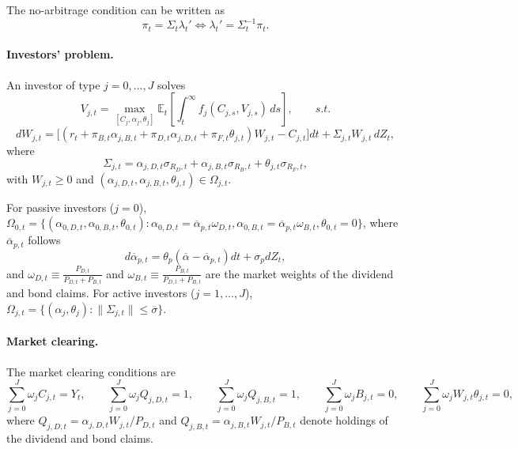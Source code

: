 \documentclass[11pt,english]{article}
\begin{document}
The no-arbitrage condition can be written as
\begin{equation}
    \pi_t = \Sigma_t \lambda_t' \iff \lambda_t'  = \Sigma_t^{-1} \pi_t.
\end{equation}

\paragraph{Investors' problem.} 

An investor of type $j = 0,\ldots,J$ solves
\begin{equation}\label{eq:inv-problem}
    V_{j,t} = \max_{[C_j,\alpha_j,\theta_j]} 
    \mathbb{E}_t \left[ \int_t^\infty f_j(C_{j,s},V_{j,s})\, ds \right], \qquad s.t.
\end{equation}
\begin{equation}
dW_{j,t} = \big[(r_t + \pi_{B,t} \alpha_{j,B,t}+ \pi_{D,t} \alpha_{j,D,t} + \pi_{F,t} \theta_{j,t}) W_{j,t} - C_{j,t}\big] dt 
    + \Sigma_{j,t} W_{j,t} \, dZ_t,
\end{equation}
where 
\begin{equation}
    \Sigma_{j,t} = \alpha_{j,D,t} \sigma_{R_D,t} +\alpha_{j,B,t} \sigma_{R_B,t} + \theta_{j,t} \sigma_{R_F,t},
\end{equation}
with $W_{j,t} \geq 0$ and $(\alpha_{j,D,t}, \alpha_{j,B,t}, \theta_{j,t}) \in \Omega_{j,t}$. 

For passive investors ($j=0$),  
$\Omega_{0,t} = \{(\alpha_{0,D,t}, \alpha_{0,B,t}, \theta_{0,t}): \alpha_{0,D,t} = \overline{\alpha}_{p,t} \omega_{D,t}, \alpha_{0,B,t} = \overline{\alpha}_{p,t} \omega_{B,t}, \theta_{0,t} = 0\}$, where $\overline{\alpha}_{p,t}$ follows 
\begin{equation}
    d \overline{\alpha}_{p,t} = \theta_p (\overline{\alpha} - \overline{\alpha}_{p,t}) dt + \sigma_{p}  d Z_t,
\end{equation}	
and $\omega_{D,t} \equiv \frac{P_{D,t}}{P_{D,t}+P_{B,t}}$ and $\omega_{B,t} \equiv \frac{P_{B,t}}{P_{D,t}+P_{B,t}}$ are the market weights of the dividend and bond claims.
For active investors ($j=1,\ldots,J$),  
$\Omega_{j,t} = \{(\alpha_j, \theta_j): \| \Sigma_{j,t} \| \leq \overline{\sigma}\}$. 

\paragraph{Market clearing.} The  market clearing conditions are
\begin{equation}
	\sum_{j=0}^J \omega_j C_{j,t} = Y_t, 
	\qquad 
	\sum_{j=0}^J \omega_j Q_{j,D,t} = 1, 
	\qquad 
	\sum_{j=0}^J \omega_j Q_{j,B,t} = 1, 
	\qquad 
	\sum_{j=0}^J \omega_j B_{j,t} = 0,
	\qquad
	\sum_{j=0}^J \omega_j W_{j,t} \theta_{j,t} = 0,
\end{equation}
where $Q_{j,D,t} = \alpha_{j,D,t} W_{j,t} / P_{D,t}$ and $Q_{j,B,t} = \alpha_{j,B,t} W_{j,t} / P_{B,t}$ denote holdings of the dividend and bond claims. 
\end{document}
